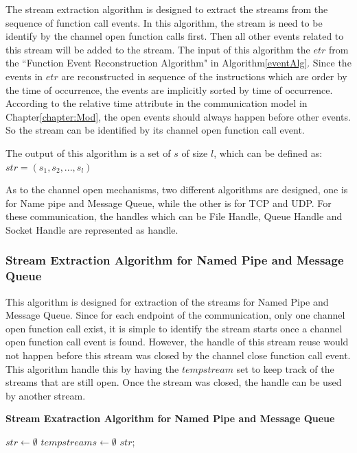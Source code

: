 The stream extraction algorithm is designed to extract the streams from the sequence of function call events. In this algorithm, the stream is need to be identify by the channel open function calls first. Then all other events related to this stream will be added to the stream.
The input of this algorithm the $etr$ from the ``Function Event Reconstruction Algorithm" in Algorithm\ref{eventAlg}. Since the events in $etr$ are reconstructed in sequence of the instructions which are order by the time of occurrence, the events are implicitly sorted by time of occurrence. According to the relative time attribute in the communication model in Chapter\ref{chapter:Mod}, the open events should always happen before other events. So the stream can be identified by its channel open function call event. 

The output of this algorithm is a set of $s$ of size $l$, which can be defined as:
$str = (s_1, s_2, ..., s_l)$

As to the channel open mechanisms, two different algorithms are designed, one is for Name pipe and Message Queue, while the other is for TCP and UDP. For these communication, the handles which can be File Handle, Queue Handle and Socket Handle are represented as handle.

\subsubsection{Stream Extraction Algorithm for Named Pipe and Message Queue}
This algorithm is designed for extraction of the streams for Named Pipe and Message Queue. Since for each endpoint of the communication, only one channel open function call exist, it is simple to identify the stream starts once a channel open function call event is found. However, the handle of this stream reuse would not happen before this stream was closed by the channel close function call event. This algorithm handle this by having the $tempstream$ set to keep track of the streams that are still open. Once the stream was closed, the handle can be used by another stream.
\begin{algorithm}[H]
\DontPrintSemicolon
\caption{{\bf Stream Exatraction Algorithm for Named Pipe and Message Queue} \label{streamext1}}
$str \leftarrow \emptyset$\; 
$tempstreams \leftarrow \emptyset$ \;  
\KwRet $str$;\;
\end{algorithm} 

